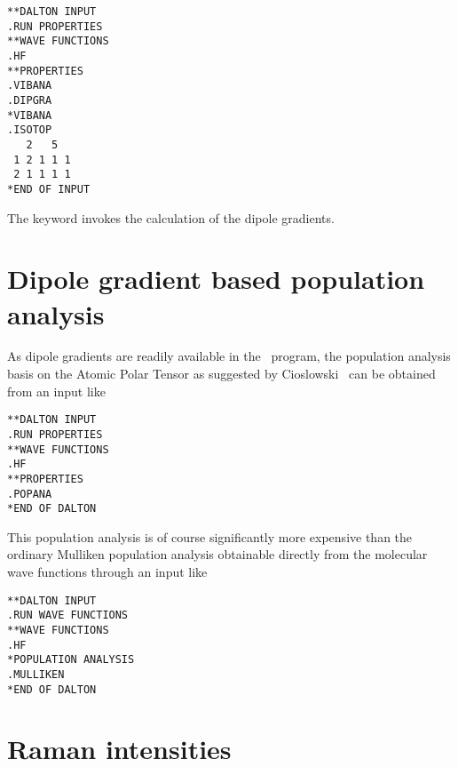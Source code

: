 \begin{verbatim}
**DALTON INPUT
.RUN PROPERTIES
**WAVE FUNCTIONS
.HF
**PROPERTIES
.VIBANA
.DIPGRA
*VIBANA
.ISOTOP
   2   5
 1 2 1 1 1
 2 1 1 1 1
*END OF INPUT
\end{verbatim}

\noindent The keyword  invokes the calculation of the dipole
gradients.

\section{Dipole gradient based population analysis}

\begin{center}
\end{center}

 As dipole gradients are readily available in the
\siraba\ program, the
population analysis basis on the Atomic Polar Tensor as suggested by
Cioslowski~\cite{jcjacs111,poakrkvmthjpca102} can be obtained from an input like

\begin{verbatim}
**DALTON INPUT
.RUN PROPERTIES
**WAVE FUNCTIONS
.HF
**PROPERTIES
.POPANA
*END OF DALTON
\end{verbatim}

This population analysis is of course significantly more expensive
than the ordinary Mulliken population analysis obtainable directly
from the molecular wave functions through an input like

\begin{verbatim}
**DALTON INPUT
.RUN WAVE FUNCTIONS
**WAVE FUNCTIONS
.HF
*POPULATION ANALYSIS
.MULLIKEN
*END OF DALTON
\end{verbatim}


\section{Raman intensities}\label{sec:ramanint}

